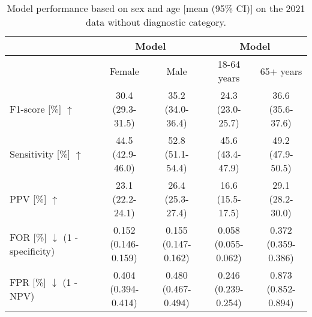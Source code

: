 {\begin{table}[h]
\begin{tabular}{l|cc|cc}
        \bottomrule
    \end{tabular}%
\end{table}


\begin{table}[h]
    \centering
    \caption{Model performance based on sex and age [mean (95\% CI)] on the 2021 data without diagnostic category.}
    \label{tab_retrospective:tableA3}
    \begin{tabular}{l|cc|cc}
        \toprule

         & \multicolumn{2}{c|}{Model} & \multicolumn{2}{c}{Model} \\
        \midrule
         & Female & Male & 18-64 years & 65+ years \\

        \midrule

        F1-score [\%] $\uparrow$ & \makecell{30.4 \\ (29.3-31.5)} & \makecell{35.2 \\ (34.0-36.4)} & \makecell{24.3 \\ (23.0-25.7)} & \makecell{36.6 \\ (35.6-37.6)} \\
        \midrule
        Sensitivity [\%] $\uparrow$ & \makecell{44.5 \\ (42.9-46.0)} & \makecell{52.8 \\ (51.1-54.4)} & \makecell{45.6 \\ (43.4-47.9)} & \makecell{49.2 \\ (47.9-50.5)} \\
        \midrule
        PPV [\%] $\uparrow$ & \makecell{23.1 \\ (22.2-24.1)} & \makecell{26.4 \\ (25.3-27.4)} & \makecell{16.6 \\ (15.5-17.5)} & \makecell{29.1 \\ (28.2-30.0)} \\
        \midrule
        \makecell[l]{FOR [\%] $\downarrow$ \\ (1 - specificity)} & \makecell{0.152 \\ (0.146-0.159)} & \makecell{0.155 \\ (0.147-0.162)} & \makecell{0.058 \\ (0.055-0.062)} & \makecell{0.372 \\ (0.359-0.386)} \\
        \midrule
        \makecell[l]{FPR [\%] $\downarrow$ \\ (1 - NPV)} & \makecell{0.404 \\ (0.394-0.414)} & \makecell{0.480 \\ (0.467-0.494)} & \makecell{0.246 \\ (0.239-0.254)} & \makecell{0.873 \\ (0.852-0.894)} \\


\end{tabular}
\end{table}}
